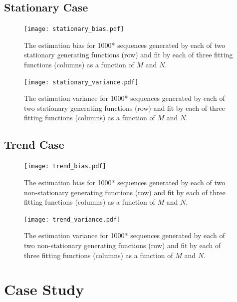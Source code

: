 \documentclass[11pt]{article}
\begin{document}
\subsection{Stationary Case}

\begin{figure}[ht]
  \texttt{[image: stationary\_bias.pdf]}
  \caption{The estimation bias for 1000* sequences generated by each of two stationary generating functions (row) and fit by each of three fitting functions (columns) as a function of \(M\) and \(N\).\label{fig:stationary-bias}}
\end{figure}

\begin{figure}[ht]
  \texttt{[image: stationary\_variance.pdf]}
  \caption{The estimation variance for 1000* sequences generated by each of two stationary generating functions (row) and fit by each of three fitting functions (columns) as a function of \(M\) and \(N\).\label{fig:stationary-bias}}
\end{figure}


\subsection{Trend Case}

\begin{figure}[ht]
  \texttt{[image: trend\_bias.pdf]}
  \caption{The estimation bias for 1000* sequences generated by each of two non-stationary generating functions (row) and fit by each of three fitting functions (columns) as a function of \(M\) and \(N\).\label{fig:stationary-bias}}
\end{figure}

\begin{figure}[ht]
  \texttt{[image: trend\_variance.pdf]}
  \caption{The estimation variance for 1000* sequences generated by each of two non-stationary generating functions (row) and fit by each of three fitting functions (columns) as a function of \(M\) and \(N\).\label{fig:stationary-bias}}
\end{figure}

\section{Case Study}
\end{document}

